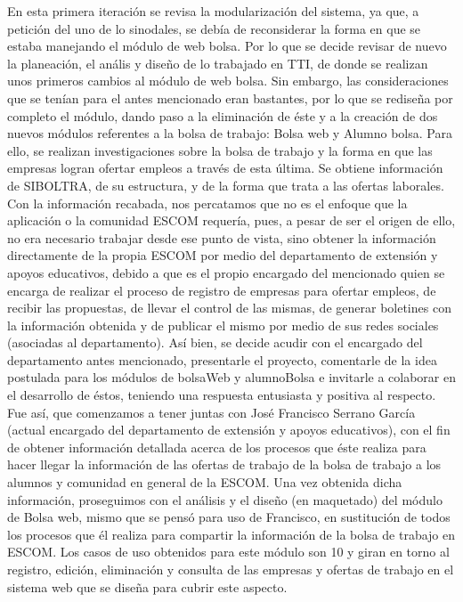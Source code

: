 \noindent
En esta primera iteración se revisa la modularización del sistema, ya que, a petición del uno de lo sinodales, se debía de reconsiderar la forma en que se estaba manejando el módulo de web bolsa. Por lo que se decide revisar de nuevo la planeación, el anális y diseño de lo trabajado en TTI, de donde se realizan unos primeros cambios al módulo de web bolsa. Sin embargo, las consideraciones que se tenían para el antes mencionado eran bastantes, por lo que se rediseña por completo el módulo, dando paso a la eliminación de éste y a la creación de dos nuevos módulos referentes a la bolsa de trabajo: Bolsa web y Alumno bolsa. 
\newline
\newline
Para ello, se realizan investigaciones sobre la bolsa de trabajo y la forma en que las empresas logran ofertar empleos a través de esta última. Se obtiene información de SIBOLTRA, de su estructura, y de la forma que trata a las ofertas laborales. Con la información recabada, nos percatamos que no es el enfoque que la aplicación o la comunidad ESCOM requería, pues, a pesar de ser el origen de ello, no era necesario trabajar desde ese punto de vista, sino obtener la información directamente de la propia ESCOM por medio del departamento de extensión y apoyos educativos, debido a que es el propio encargado del mencionado quien se encarga de realizar el proceso de registro de empresas para ofertar empleos, de recibir las propuestas, de llevar el control de las mismas, de generar boletines con la información obtenida y de publicar el mismo por medio de sus redes sociales (asociadas al departamento). Así bien, se decide acudir con el encargado del departamento antes mencionado, presentarle el proyecto, comentarle de la idea postulada para los módulos de bolsaWeb y alumnoBolsa e invitarle a colaborar en el desarrollo de éstos, teniendo una respuesta entusiasta y positiva al respecto. 
\newline
\newline
Fue así, que comenzamos a tener juntas con José Francisco Serrano García (actual encargado del departamento de extensión y apoyos educativos), con el fin de obtener información detallada acerca de los procesos que éste realiza para hacer llegar la información de las ofertas de trabajo de la bolsa de trabajo a los alumnos y comunidad en general de la ESCOM. Una vez obtenida dicha información, proseguimos con el análisis y el diseño (en maquetado) del módulo de Bolsa web, mismo que se pensó para uso de Francisco, en sustitución de todos los procesos que él realiza para compartir la información de la bolsa de trabajo en ESCOM. Los casos de uso obtenidos para este módulo son 10 y giran en torno al registro, edición, eliminación y consulta de las empresas y ofertas de trabajo en el sistema web que se diseña para cubrir este aspecto. 
